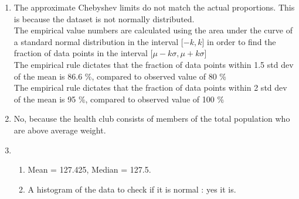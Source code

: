 \begin{enumerate}
\begin{enumerate}
		\begin{figure}[H]
			\centering
		\end{figure} 
		
		
	\end{enumerate}
	
	\item The approximate Chebyshev limits do not match the actual proportions. This is because the dataset is not normally distributed. \\
	
	The empirical value numbers are calculated using the area under the curve of a standard normal distribution in the interval [$ -k, k $] in order to find the fraction of data points in the interval [$ \mu - k \sigma, \mu + k \sigma $] \\
	
	The empirical rule dictates that the fraction of data points within 1.5 std dev of the mean is 86.6 \%, compared to observed value of 80 \% \\
	The empirical rule dictates that the fraction of data points within 2 std dev of the mean is 95 \%, compared to observed value of 100 \% \\
	
	\item No, because the health club consists of members of the total population who are above average weight. 
	
	\item \begin{enumerate}
		\item Mean = 127.425, Median = 127.5. \\
		
		\item A histogram of the data to check if it is normal : yes it is. \\
		
		\begin{figure}[H]
			\centering
		\end{figure} 
		

\end{enumerate}
\end{enumerate}
